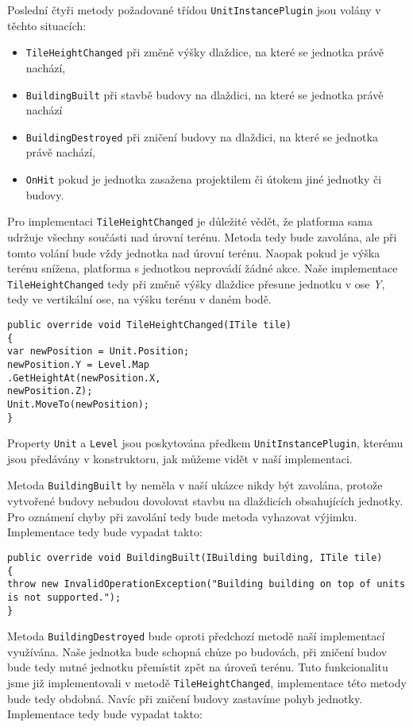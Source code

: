 Poslední čtyři metody požadované třídou \texttt{UnitInstancePlugin} jsou volány v těchto situacích:
\begin{itemize}
	\item \texttt{TileHeightChanged} při změně výšky dlaždice, na které se jednotka právě nachází,
	\item \texttt{BuildingBuilt} při stavbě budovy na dlaždici, na které se jednotka právě nachází
	\item \texttt{BuildingDestroyed} při zničení budovy na dlaždici, na které se jednotka právě nachází,
	\item \texttt{OnHit} pokud je jednotka zasažena projektilem či útokem jiné jednotky či budovy.
\end{itemize}


Pro implementaci \texttt{TileHeightChanged} je důležité vědět, že platforma sama udržuje všechny součásti nad úrovní terénu. Metoda tedy bude zavolána, ale při tomto volání bude vždy jednotka nad úrovní terénu. Naopak pokud je výška terénu snížena, platforma s jednotkou neprovádí žádné akce. Naše implementace \texttt{TileHeightChanged} tedy při změně výšky dlaždice přesune jednotku v ose \textit{Y}, tedy ve vertikální ose, na výšku terénu v daném bodě.


\begin{lstlisting}
public override void TileHeightChanged(ITile tile)
{
var newPosition = Unit.Position;
newPosition.Y = Level.Map
.GetHeightAt(newPosition.X,
newPosition.Z);
Unit.MoveTo(newPosition);
}
\end{lstlisting}

Property \texttt{Unit} a \texttt{Level} jsou poskytována předkem \texttt{UnitInstancePlugin}, kterému jsou předávány v konstruktoru, jak můžeme vidět v naší implementaci.


Metoda \texttt{BuildingBuilt} by neměla v naší ukázce nikdy být zavolána, protože vytvořené budovy nebudou dovolovat stavbu na dlaždicích obsahujících jednotky. Pro oznámení chyby při zavolání tedy bude metoda vyhazovat výjimku. Implementace tedy bude vypadat takto:

\begin{lstlisting}
public override void BuildingBuilt(IBuilding building, ITile tile)
{
throw new InvalidOperationException("Building building on top of units is not supported.");
}
\end{lstlisting}

Metoda \texttt{BuildingDestroyed} bude oproti předchozí metodě naší implementací využívána. Naše jednotka bude schopná chůze po budovách, při zničení budov bude tedy nutné jednotku přemístit zpět na úroveň terénu. Tuto funkcionalitu jsme již implementovali v metodě \texttt{TileHeightChanged}, implementace této metody bude tedy obdobná. Navíc při zničení budovy zastavíme pohyb jednotky. Implementace tedy bude vypadat takto:

